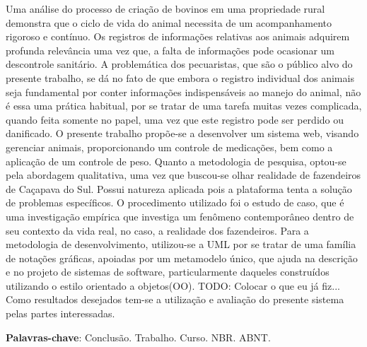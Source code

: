 %
%

\begin{RESUMO}
\thispagestyle{empty}
	\begin{SingleSpace}
	
		\hspace{-1.2 cm}  Uma análise do processo de criação de bovinos em uma propriedade rural demonstra que o ciclo de vida do animal necessita de um acompanhamento rigoroso e contínuo. Os registros de informações relativas aos animais adquirem profunda relevância uma vez que, a falta de informações pode ocasionar um descontrole sanitário. A problemática dos pecuaristas, que são o público alvo do presente trabalho, se dá no fato de que embora o registro individual dos animais seja fundamental por conter informações indispensáveis ao manejo do animal, não é essa uma prática habitual, por se tratar de uma tarefa muitas vezes complicada, quando feita somente no papel, uma vez que este registro pode ser perdido ou danificado. O presente trabalho propõe-se a desenvolver um sistema web, visando gerenciar animais, proporcionando um controle de medicações, bem como a aplicação de um controle de peso. Quanto a metodologia de pesquisa, optou-se pela abordagem qualitativa, uma vez que buscou-se olhar realidade de fazendeiros de Caçapava do Sul. Possui natureza aplicada pois a plataforma tenta a solução de problemas específicos. O procedimento utilizado foi o estudo de caso, que é uma investigação empírica que investiga um fenômeno contemporâneo dentro de seu contexto da vida real, no caso, a realidade dos fazendeiros. Para a metodologia de desenvolvimento, utilizou-se a UML por se tratar de uma família de notações gráficas, apoiadas por um metamodelo único, que ajuda na descrição e no projeto de sistemas de software, particularmente daqueles construídos utilizando o estilo orientado a objetos(OO). TODO: Colocar o que eu já fiz... Como resultados desejados tem-se a utilização e avaliação do presente sistema pelas partes interessadas.

		\vspace*{0.5cm}\hspace{-1.3 cm}\textbf{Palavras-chave}: Conclusão. Trabalho. Curso. NBR. ABNT.
		
		
		
	\end{SingleSpace}
\end{RESUMO}


